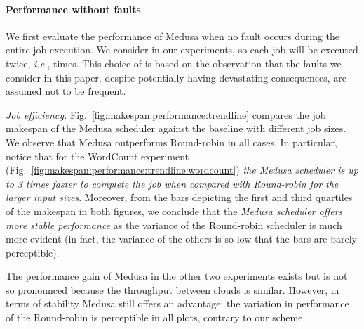 \documentclass[10pt, conference, compsocconf]{IEEEtran}
\begin{document}
\paragraph{Performance without faults}
We first evaluate the performance of Medusa when no fault occurs during the entire job execution.
We consider  in our experiments, so each job will be executed twice, \textit{i.e.},  times.
This choice of  is based on the observation that the faults we consider in this paper, despite potentially having devastating consequences, are assumed not to be frequent.

\textit{Job efficiency.} Fig.~\ref{fig:makespan:performance:trendline} compares the job makespan of the Medusa scheduler against the baseline with different job sizes.
We observe that Medusa outperforms Round-robin in all cases.
In particular, notice that for the WordCount experiment (Fig.~\ref{fig:makespan:performance:trendline:wordcount}) \emph{the Medusa scheduler is up to 3 times faster to complete the job when compared with Round-robin for the larger input sizes}.
Moreover, from the  bars depicting the first and third quartiles of the makespan in both figures, we conclude that the \emph{Medusa scheduler offers more stable performance} as the variance of the Round-robin scheduler is much more evident (in fact, the variance of the others is so low that the  bars are barely perceptible).

The performance gain of Medusa in the other two experiments exists but is not so pronounced because the throughput between clouds is similar.
However, in terms of stability Medusa still offers an advantage: the variation in performance of the Round-robin is perceptible in all plots, contrary to our scheme.
\end{document}
